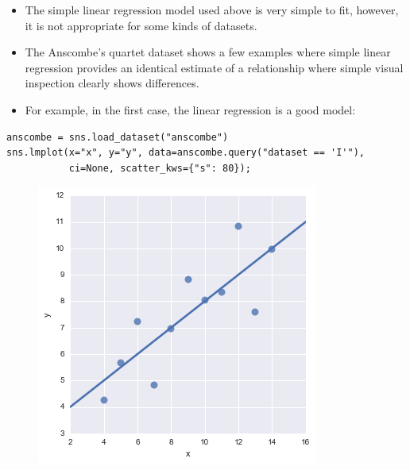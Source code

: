 \documentclass{beamer}
\begin{document}
\begin{frame}
\large
\begin{itemize}
\item The simple linear regression model used above is very simple to fit, however, it is not appropriate for some kinds of datasets. \item The Anscombe’s quartet dataset shows a few examples where simple linear regression provides an identical estimate of a relationship where simple visual inspection clearly shows differences. 
\item For example, in the first case, the linear regression is a good model:
\end{itemize}
\end{frame}

\begin{frame}[fragile]
\begin{framed}
\begin{verbatim}
anscombe = sns.load_dataset("anscombe")
sns.lmplot(x="x", y="y", data=anscombe.query("dataset == 'I'"),
           ci=None, scatter_kws={"s": 80});
    \end{verbatim}
       \end{framed}
    \end{frame}

    \begin{frame}
    	\large	
\begin{figure}
\centering
\includegraphics[width=0.7\linewidth]{images/regression_19_0}
\end{figure}

\end{frame}
\end{document}
